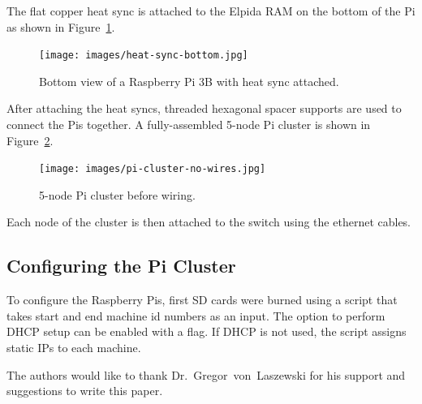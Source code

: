 The flat copper heat sync is attached to the Elpida RAM on the bottom
of the Pi as shown in Figure~\ref{f:heat-sync-bottom}.

\begin{figure}[!ht]
  \centering\texttt{[image: images/heat-sync-bottom.jpg]} \caption{Bottom
  view of a Raspberry Pi 3B with heat sync
  attached.}\label{f:heat-sync-bottom}
\end{figure}

After attaching the heat syncs, threaded hexagonal spacer supports are
used to connect the Pis together. A fully-assembled 5-node Pi cluster
is shown in Figure~\ref{f:cluster-no-wires}.

\begin{figure}[!ht]
  \centering\texttt{[image: images/pi-cluster-no-wires.jpg]}
  \caption{5-node Pi cluster before wiring.}\label{f:cluster-no-wires}
\end{figure}

Each node of the cluster is then attached to the switch using the
ethernet cables.

\subsection{Configuring the Pi Cluster}
To configure the Raspberry Pis, first SD cards were burned using a
script that takes start and end machine id numbers as an input. The
option to perform DHCP setup can be enabled with a flag. If DHCP is
not used, the script assigns static IPs to each machine.

\begin{acks}

  The authors would like to thank Dr.~Gregor~von~Laszewski for his
  support and suggestions to write this paper.

\end{acks}




